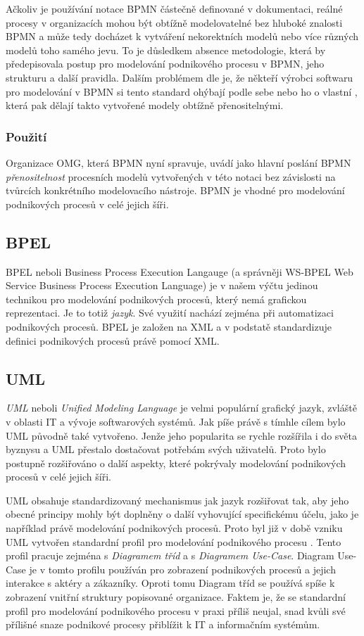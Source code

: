 Ačkoliv je používání notace BPMN částečně definované v dokumentaci, reálné procesy v organizacích mohou být obtížně modelovatelné bez hluboké znalosti BPMN a může tedy docházet k vytváření nekorektních modelů nebo více různých modelů toho samého jevu. To je důsledkem absence metodologie, která by předepisovala postup pro modelování podnikového procesu v BPMN, jeho strukturu a další pravidla. Dalším problémem dle \cite{Polancic2014} je, že někteří výrobci softwaru pro modelování v BPMN si tento standard ohýbají podle sebe nebo ho  o vlastní , která pak dělají takto vytvořené modely obtížně přenositelnými.

\subsubsection{Použití}
Organizace OMG, která BPMN nyní spravuje, uvádí jako hlavní poslání BPMN \textit{přenositelnost} procesních modelů vytvořených v této notaci bez závislosti na tvůrcích konkrétního modelovacího nástroje. BPMN je vhodné pro modelování podnikových procesů v celé jejich šíři.

\subsection{BPEL}
BPEL neboli Business Process Execution Langauge (a správněji WS-BPEL Web Service Business Process Execution Language) je v našem výčtu jedinou technikou pro modelování podnikových procesů, který nemá grafickou reprezentaci. Je to totiž \textit{jazyk}. Své využití nachází zejména při automatizaci podnikových procesů. BPEL je založen na XML a v podstatě standardizuje  definici podnikových procesů právě pomocí XML. \cite{BPELcz}

\subsection{UML}
\textit{UML} neboli \textit{Unified Modeling Language} je velmi populární grafický jazyk, zvláště v oblasti IT a vývoje softwarových systémů. Jak píše \cite{Eriksson} právě s tímhle cílem bylo UML původně také vytvořeno. Jenže jeho popularita se rychle rozšířila i do světa byznysu a UML přestalo dostačovat potřebám svých uživatelů. Proto bylo postupně rozšiřováno o další aspekty, které pokrývaly modelování podnikových procesů v celé jejich šíři.

UML obsahuje standardizovaný mechanismus jak jazyk rozšiřovat tak, aby jeho obecné principy mohly být doplněny o další vyhovující specifickému účelu, jako je například právě modelování podnikových procesů. Proto byl již v době vzniku UML vytvořen standardní profil pro modelování podnikového procesu \cite{Repa2007}. Tento profil pracuje zejména s \textit{Diagramem tříd} a s \textit{Diagramem Use-Case}. Diagram Use-Case je v tomto profilu používán pro zobrazení podnikových procesů a jejich interakce s aktéry a zákazníky. Oproti tomu Diagram tříd se používá spíše k zobrazení vnitřní struktury popisované organizace. Faktem je, že se standardní profil pro modelování podnikového procesu v praxi příliš neujal, snad kvůli své přílišné snaze podnikové procesy přiblížit k IT a informačním  systémům. \cite{Repa2007}

